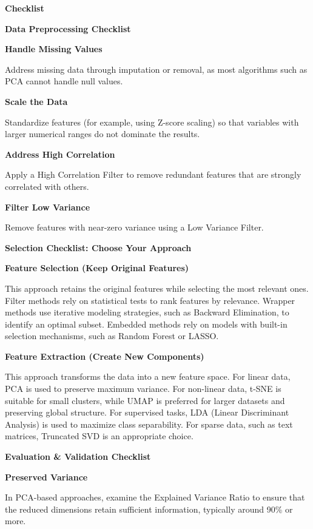 \documentclass{book}
\providecommand{\ProjectDeepHeading}[2]{%
    \par\medskip\noindent\textbf{#2}\par\smallskip
}
\begin{document}
\ProjectDeepHeading{2}{Checklist}
        \ProjectDeepHeading{3}{Data Preprocessing Checklist}
            
            \ProjectDeepHeading{5}{Handle Missing Values}
                Address missing data through imputation or removal, as most algorithms such as PCA cannot handle null values.
            
            \ProjectDeepHeading{5}{Scale the Data}
                Standardize features (for example, using Z-score scaling) so that variables with larger numerical ranges do not dominate the results.
            
            \ProjectDeepHeading{5}{Address High Correlation}
                Apply a High Correlation Filter to remove redundant features that are strongly correlated with others.
            
            \ProjectDeepHeading{5}{Filter Low Variance}
                Remove features with near-zero variance using a Low Variance Filter.
    
    \ProjectDeepHeading{3}{Selection Checklist: Choose Your Approach}
        
        \ProjectDeepHeading{5}{Feature Selection (Keep Original Features)}
            This approach retains the original features while selecting the most relevant ones. Filter methods rely on statistical tests to rank features by relevance. Wrapper methods use iterative modeling strategies, such as Backward Elimination, to identify an optimal subset. Embedded methods rely on models with built-in selection mechanisms, such as Random Forest or LASSO.
        
        \ProjectDeepHeading{5}{Feature Extraction (Create New Components)}
            This approach transforms the data into a new feature space. For linear data, PCA is used to preserve maximum variance. For non-linear data, t-SNE is suitable for small clusters, while UMAP is preferred for larger datasets and preserving global structure. For supervised tasks, LDA (Linear Discriminant Analysis) is used to maximize class separability. For sparse data, such as text matrices, Truncated SVD is an appropriate choice.

\ProjectDeepHeading{3}{Evaluation \& Validation Checklist}
    
    \ProjectDeepHeading{5}{Preserved Variance}
        In PCA-based approaches, examine the Explained Variance Ratio to ensure that the reduced dimensions retain sufficient information, typically around 90\% or more.
    
\end{document}
